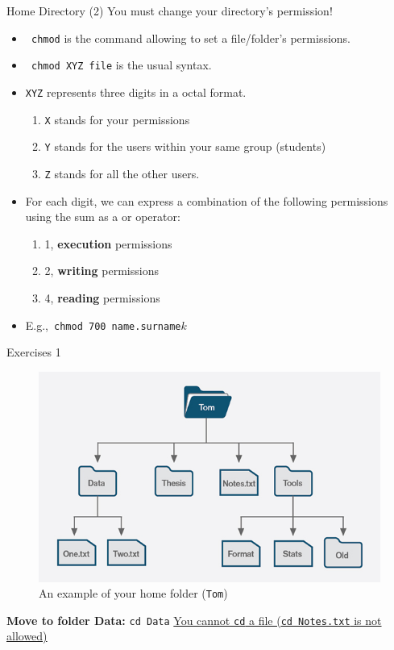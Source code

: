 \documentclass{beamer}
\begin{document}
  \begin{frame}{Home Directory (2)}
  	You must change your directory's permission!
	\begin{itemize}
		\item  \texttt{\color{green} chmod} is the command allowing to set a file/folder's permissions.
		\item  \texttt{\color{green} chmod \color{red} XYZ \color{blue} file} is the usual syntax.
		\item \texttt{\color{red}XYZ} represents three digits in a octal format. 
		\begin{enumerate}
			\item  \texttt{\color{red}X} stands for your permissions
			\item \texttt{\color{red}Y} stands for the users within your same group (students)
			\item \texttt{\color{red}Z} stands for all the other users.
		\end{enumerate}
		\item For each digit, we can express a combination of the following permissions using the sum as a or operator:
		\begin{enumerate}
			\item 1, \textbf{execution} permissions
			\item 2, \textbf{writing} permissions
			\item 4, \textbf{reading} permissions
		\end{enumerate}
	\item E.g.,\, \texttt{chmod 700 name.surname$k$}
	\end{itemize}
\end{frame}

\begin{frame}{Exercises 1}
\begin{figure}
	\centering
	\includegraphics[width=0.7\linewidth]{00shell}
	\caption{An example of your home folder (\texttt{Tom})}
	\label{fig:00shell}
\end{figure}
\textbf{Move to folder Data:} \pause \texttt{cd Data}
\underline{You cannot \texttt{cd} a file (\texttt{cd Notes.txt} is not allowed)}
\end{frame}
\end{document}

